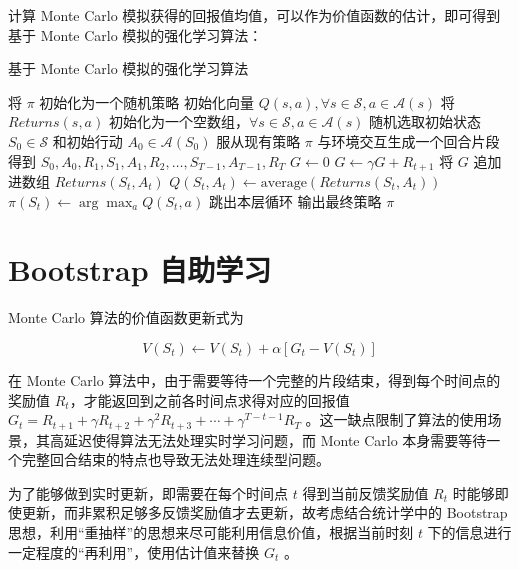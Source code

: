 计算 Monte Carlo 模拟获得的回报值均值，可以作为价值函数的估计，即可得到基于 Monte Carlo 模拟的强化学习算法：

\begin{algorithm}[H]
    \caption{基于 Monte Carlo 模拟的强化学习算法}
    \begin{algorithmic}[1] %
        \State 将 $\pi$ 初始化为一个随机策略
        \State 初始化向量 $Q(s,a), \forall s\in \mathcal S,a\in \mathcal{A}(s)$
        \State 将 $Returns(s,a)$ 初始化为一个空数组，$\forall s\in\mathcal S,a\in\mathcal{A}(s)$
        \Loop
        \State 随机选取初始状态 $S_0\in\mathcal S$ 和初始行动 $A_0\in\mathcal{A}(S_0)$
        \State 服从现有策略 $\pi$ 与环境交互生成一个回合片段
        \State 得到 $S_{0}, A_{0}, R_{1}, S_{1}, A_{1}, R_{2}, \ldots, S_{T-1}, A_{T-1}, R_{T}$
        \State $G\leftarrow 0$
        \State $G \leftarrow \gamma G+R_{t+1}$
        \State 将 $G$ 追加进数组 $Returns(S_t,A_t)$
        \State $Q(S_t,A_t)\leftarrow \mathrm{average}(Returns(S_t,A_t))$
        \State $\pi(S_t)\leftarrow \arg\max_aQ(S_t,a)$
        \State 跳出本层循环
        \EndIf
        \EndFor
        \EndLoop
        \State
        \State 输出最终策略 $\pi$
    \end{algorithmic}
\end{algorithm}

\section{Bootstrap 自助学习}

Monte Carlo 算法的价值函数更新式为

\begin{equation}\label{eq:mcupdate}
    V(S_t)\leftarrow V(S_t)+\alpha\left[G_t-V(S_t)\right]
\end{equation}

在 Monte Carlo 算法中，由于需要等待一个完整的片段结束，得到每个时间点的奖励值 $R_t$，才能返回到之前各时间点求得对应的回报值 $G_t = R_{t+1}+\gamma R_{t+2}+\gamma^2 R_{t+3}+\cdots+\gamma^{T-t-1} R_T$ 。这一缺点限制了算法的使用场景，其高延迟使得算法无法处理实时学习问题，而 Monte Carlo 本身需要等待一个完整回合结束的特点也导致无法处理连续型问题。

为了能够做到实时更新，即需要在每个时间点 $t$ 得到当前反馈奖励值 $R_t$ 时能够即使更新，而非累积足够多反馈奖励值才去更新，故考虑结合统计学中的 Bootstrap 思想\cite{efron1994introduction}\cite{2014wzjstatistics}，利用“重抽样”的思想来尽可能利用信息价值，根据当前时刻 $t$ 下的信息进行一定程度的“再利用”，使用估计值来替换 $G_t$ 。

